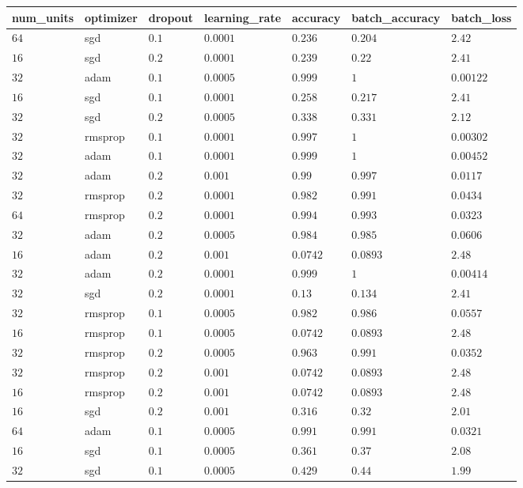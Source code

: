 \begin{table}[tbp]
\begin{tabular}{lllllll}
num\_units & optimizer & dropout & learning\_rate & accuracy & batch\_accuracy & batch\_loss \\ \hline
$64$ & sgd & $0.1$ & $0.0001$ & $0.236$ & $0.204$ & $2.42$ \\
$16$ & sgd & $0.2$ & $0.0001$ & $0.239$ & $0.22$ & $2.41$ \\
$32$ & adam & $0.1$ & $0.0005$ & $0.999$ & $1$ & $0.00122$ \\
$16$ & sgd & $0.1$ & $0.0001$ & $0.258$ & $0.217$ & $2.41$ \\
$32$ & sgd & $0.2$ & $0.0005$ & $0.338$ & $0.331$ & $2.12$ \\
$32$ & rmsprop & $0.1$ & $0.0001$ & $0.997$ & $1$ & $0.00302$ \\
$32$ & adam & $0.1$ & $0.0001$ & $0.999$ & $1$ & $0.00452$ \\
$32$ & adam & $0.2$ & $0.001$ & $0.99$ & $0.997$ & $0.0117$ \\
$32$ & rmsprop & $0.2$ & $0.0001$ & $0.982$ & $0.991$ & $0.0434$ \\
$64$ & rmsprop & $0.2$ & $0.0001$ & $0.994$ & $0.993$ & $0.0323$ \\
$32$ & adam & $0.2$ & $0.0005$ & $0.984$ & $0.985$ & $0.0606$ \\
$16$ & adam & $0.2$ & $0.001$ & $0.0742$ & $0.0893$ & $2.48$ \\
$32$ & adam & $0.2$ & $0.0001$ & $0.999$ & $1$ & $0.00414$ \\
$32$ & sgd & $0.2$ & $0.0001$ & $0.13$ & $0.134$ & $2.41$ \\
$32$ & rmsprop & $0.1$ & $0.0005$ & $0.982$ & $0.986$ & $0.0557$ \\
$16$ & rmsprop & $0.1$ & $0.0005$ & $0.0742$ & $0.0893$ & $2.48$ \\
$32$ & rmsprop & $0.2$ & $0.0005$ & $0.963$ & $0.991$ & $0.0352$ \\
$32$ & rmsprop & $0.2$ & $0.001$ & $0.0742$ & $0.0893$ & $2.48$ \\
$16$ & rmsprop & $0.2$ & $0.001$ & $0.0742$ & $0.0893$ & $2.48$ \\
$16$ & sgd & $0.2$ & $0.001$ & $0.316$ & $0.32$ & $2.01$ \\
$64$ & adam & $0.1$ & $0.0005$ & $0.991$ & $0.991$ & $0.0321$ \\
$16$ & sgd & $0.1$ & $0.0005$ & $0.361$ & $0.37$ & $2.08$ \\
$32$ & sgd & $0.1$ & $0.0005$ & $0.429$ & $0.44$ & $1.99$ \\

\end{tabular}
\end{table}
